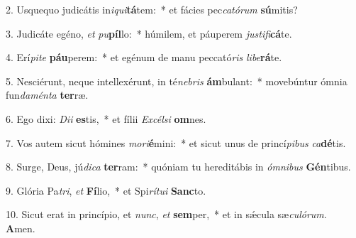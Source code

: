 2. Usquequo judicátis in\textit{i}\textit{qui}\textbf{tá}tem:~*  et fácies pec\textit{ca}\textit{tó}\textit{rum} \textbf{sú}mitis?\

3. Judicáte egéno, \textit{et} \textit{pu}\textbf{píl}lo:~*  húmilem, et páuperem \textit{jus}\textit{ti}\textit{fi}\textbf{cá}te.\

4. Erí\textit{pi}\textit{te} \textbf{páu}perem:~*  et egénum de manu peccató\textit{ris} \textit{li}\textit{be}\textbf{rá}te.\

5. Nesciérunt, neque intellexérunt, in té\textit{ne}\textit{bris} \textbf{ám}bulant:~*  movebúntur ómnia fun\textit{da}\textit{mén}\textit{ta} \textbf{ter}ræ.\

6. Ego dixi: \textit{Di}\textit{i} \textbf{es}tis,~*  et fílii \textit{Ex}\textit{cél}\textit{si} \textbf{om}nes.\

7. Vos autem sicut hómines \textit{mo}\textit{ri}\textbf{é}mini:~*  et sicut unus de princí\textit{pi}\textit{bus} \textit{ca}\textbf{dé}tis.\

8. Surge, Deus, jú\textit{di}\textit{ca} \textbf{ter}ram:~*  quóniam tu hereditábis in \textit{óm}\textit{ni}\textit{bus} \textbf{Gén}tibus.\

9. Glória Pa\textit{tri}, \textit{et} \textbf{Fí}lio,~*  et Spi\textit{rí}\textit{tu}\textit{i} \textbf{Sanc}to.\

10. Sicut erat in princípio, et \textit{nunc}, \textit{et} \textbf{sem}per,~*  et in sǽcula sæ\textit{cu}\textit{ló}\textit{rum}. \textbf{A}men.\

